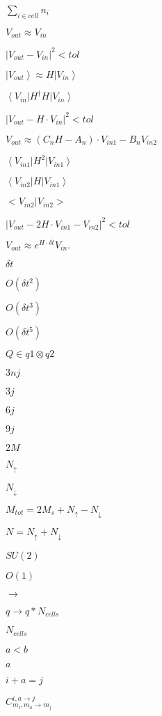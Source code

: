 \documentclass{article}
\begin{document}
$\sum_{i \in cell} n_i$
\pagebreak

$V_{out} \approx V_{in}$
\pagebreak

$\left|V_{out}-V_{in}\right|^2<tol$
\pagebreak

$\left|V_{out}\right> \approx H \left|V_{in}\right>$
\pagebreak

$\left<V_{in}\right|H^{\dagger}H\left|V_{in}\right>$
\pagebreak

$\left|V_{out} - H \cdot V_{in}\right|^2<tol$
\pagebreak

$V_{out} \approx (C_n H - A_n) \cdot V_{in1} - B_n V_{in2}$
\pagebreak

$\left<V_{in1}\right|H^2\left|V_{in1}\right>$
\pagebreak

$\left<V_{in2}\right|H\left|V_{in1}\right>$
\pagebreak

$\big<V_{in2}\big|V_{in2}\big>$
\pagebreak

$\left|V_{out} - 2H \cdot V_{in1} - V_{in2}\right|^2<tol$
\pagebreak

$V_{out} \approx e^{H \cdot \delta t} V_{in}.$
\pagebreak

$\delta t$
\pagebreak

$O(\delta t^2)$
\pagebreak

$O(\delta t^3)$
\pagebreak

$O(\delta t^5)$
\pagebreak

$Q \in q1 \otimes q2$
\pagebreak

$3nj$
\pagebreak

$3j$
\pagebreak

$6j$
\pagebreak

$9j$
\pagebreak

$2M$
\pagebreak

$N_{\uparrow}$
\pagebreak

$N_{\downarrow}$
\pagebreak

$M_{tot}=2M_{s}+N_{\uparrow}-N_{\downarrow}$
\pagebreak

$N=N_{\uparrow}+N_{\downarrow}$
\pagebreak

$SU(2)$
\pagebreak

$O(1)$
\pagebreak

$\to$
\pagebreak

$q \rightarrow q * N_{cells}$
\pagebreak

$N_{cells}$
\pagebreak

$a<b$
\pagebreak

$a$
\pagebreak

$i+a=j$
\pagebreak

$C^{i,a\rightarrow j}_{m_i,m_a\rightarrow m_j}$
\pagebreak
\end{document}
